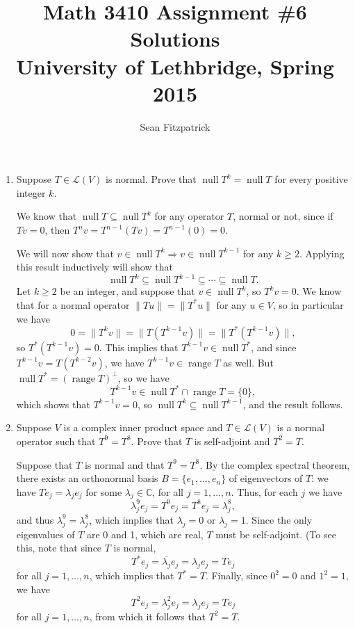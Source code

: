 \documentclass[letterpaper,12pt]{article}
\title{Math 3410 Assignment \#6 Solutions\\University of Lethbridge, Spring 2015}
\author{Sean Fitzpatrick}
\newcommand{\C}{\mathbb{C}}
\renewcommand{\L}{\mathcal{L}}
\newcommand{\len}[1]{\lVert #1\rVert}
\DeclareMathOperator{\nul}{null}
\DeclareMathOperator{\range}{range}
\begin{document}
 \maketitle


\begin{enumerate}
\item Suppose $T\in\L(V)$ is normal. Prove that $\nul T^k=\nul T$ for every positive integer $k$.

\bigskip

We know that $\nul T\subseteq \nul T^k$ for any operator $T$, normal or not, since if $Tv=0$, then $T^nv = T^{n-1}(Tv) = T^{n-1}(0)=0$.

We will now show that $v\in\nul T^{k}\Rightarrow v\in\nul T^{k-1}$ for any $k\geq 2$. Applying this result inductively will show that
\[
 \nul T^k \subseteq \nul T^{k-1} \subseteq \cdots \subseteq \nul T.
\]
Let $k\geq 2$ be an integer, and suppose that $v\in \nul T^k$, so $T^kv=0$. We know that for a normal operator $\len{Tu}=\len{T^*u}$ for any $u\in V$, so in particular we have
\[
 0=\len{T^kv} = \len{T(T^{k-1}v)}=\len{T^*(T^{k-1}v)},
\]
so $T^*(T^{k-1}v)=0$. This implies that $T^{k-1}v\in \nul T^*$, and since $T^{k-1}v=T(T^{k-2}v)$, we have $T^{k-1}v\in \range T$ as well. But $\nul T^*=(\range T)^\bot$, so we have
\[
 T^{k-1}v\in \nul T^*\cap \range T = \{0\},
\]
which shows that $T^{k-1}v=0$, so $\nul T^k\subseteq \nul T^{k-1}$, and the result follows.


\bigskip


\item Suppose $V$ is a complex inner product space and $T\in\L(V)$ is a normal operator such that $T^9=T^8$. Prove that $T$ is self-adjoint and $T^2=T$.

\bigskip

Suppose that $T$ is normal and that $T^9=T^8$. By the complex spectral theorem, there exists an orthonormal basis $B=\{e_1,\ldots, e_n\}$ of eigenvectors of $T$: we have $Te_j=\lambda_je_j$ for some $\lambda_j\in\C$, for all $j=1,\ldots, n$. Thus, for each $j$ we have
\[
 \lambda^9_je_j = T^9e_j = T^8e_j = \lambda^8_j,
\]
and thus $\lambda_j^9=\lambda^8_j$, which implies that $\lambda_j=0$ or $\lambda_j=1$. Since the only eigenvalues of $T$ are 0 and 1, which are real, $T$ must be self-adjoint. (To see this, note that since $T$ is normal, 
\[
T^*e_j = \overline{\lambda_j}e_j = \lambda_je_j = Te_j 
\]
for all $j=1,\ldots, n$, which implies that $T^*=T$. Finally, since $0^2=0$ and $1^2=1$, we have
\[
 T^2e_j = \lambda_j^2e_j = \lambda_je_j = Te_j
\]
for all $j=1,\ldots, n$, from which it follows that $T^2=T$.


\end{enumerate}
\end{document}
